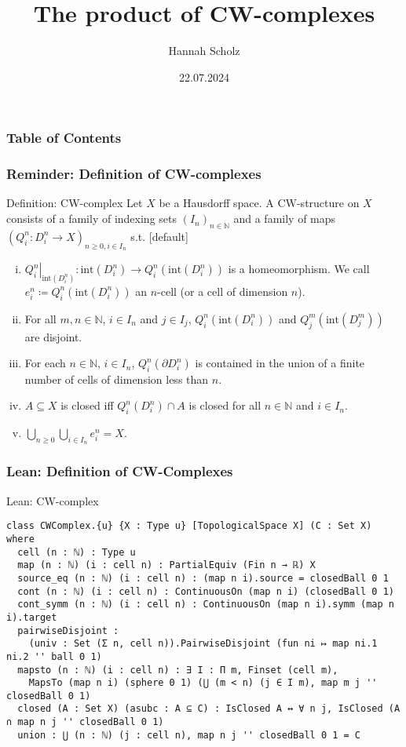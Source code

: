 \documentclass{beamer}
\title{The product of CW-complexes}
\author{Hannah Scholz}
\institute[MI]{Mathematical Institute of the University of Bonn}
\date{22.07.2024}
\newcommand{\N}{\mathbb{N}}
\newcommand{\interior}[1]{\text{int}(#1)}
\newcommand{\restrict}[2]{\ensuremath{\left.#1\right|_{#2}}}
\newcommand{\boundary}{\partial}
\begin{document}
\frame{\titlepage}

\begin{frame}
\frametitle{Table of Contents}
\tableofcontents
\end{frame}

\begin{frame}
\frametitle{Reminder: Definition of CW-complexes}
\begin{block}{Definition: CW-complex}
    Let $X$ be a Hausdorff space. 
    A \alert{CW-structure} on $X$ consists of a family of indexing sets $(I_n)_{n \in \N}$ and a family of maps $(Q_i^n\colon D_i^n\rightarrow X)_{n \ge 0, i \in I_n}$ s.t.
    [default]
    \begin{enumerate}[(i)]
        \item $\restrict{Q_i^n}{\interior{D_i^n}}\colon \interior{D_i^n} \rightarrow Q_i^n(\interior{D_i^n})$ is a homeomorphism. We call $e_i^n \coloneq Q_i^n(\interior{D_i^n})$ an \alert{$n$-cell} (or a cell of dimension $n$).
        \item For all $m, n \in \N$, $i \in I_n$ and $j \in I_j$, $Q_i^n(\interior{D_i^n})$ and $Q_j^m(\interior{D_j^m})$ are disjoint.
        \item For each $n \in \N$, $i \in I_n$, $Q_i^n(\boundary D_i^n)$ is contained in the union of a finite number of cells of dimension less than $n$.
        \item $A \subseteq X$ is closed iff $Q_i^n(D_i^n) \cap A$ is closed for all $n \in \N$ and $i \in I_n$.
        \item $\bigcup_{n \ge 0}\bigcup_{i \in I_n}e_i^n = X$.
    \end{enumerate}
\end{block}
\end{frame}

\begin{frame}[fragile]
\frametitle{Lean: Definition of CW-Complexes}
    \begin{exampleblock}{Lean: CW-complex}
    \begin{lstlisting}[basicstyle=\ttfamily\footnotesize]
class CWComplex.{u} {X : Type u} [TopologicalSpace X] (C : Set X) where
  cell (n : ℕ) : Type u
  map (n : ℕ) (i : cell n) : PartialEquiv (Fin n → ℝ) X
  source_eq (n : ℕ) (i : cell n) : (map n i).source = closedBall 0 1
  cont (n : ℕ) (i : cell n) : ContinuousOn (map n i) (closedBall 0 1)
  cont_symm (n : ℕ) (i : cell n) : ContinuousOn (map n i).symm (map n i).target
  pairwiseDisjoint :
    (univ : Set (Σ n, cell n)).PairwiseDisjoint (fun ni ↦ map ni.1 ni.2 '' ball 0 1)
  mapsto (n : ℕ) (i : cell n) : ∃ I : Π m, Finset (cell m),
    MapsTo (map n i) (sphere 0 1) (⋃ (m < n) (j ∈ I m), map m j '' closedBall 0 1)
  closed (A : Set X) (asubc : A ⊆ C) : IsClosed A ↔ ∀ n j, IsClosed (A ∩ map n j '' closedBall 0 1)
  union : ⋃ (n : ℕ) (j : cell n), map n j '' closedBall 0 1 = C
    \end{lstlisting}
    \end{exampleblock}
\end{frame}
\end{document}

